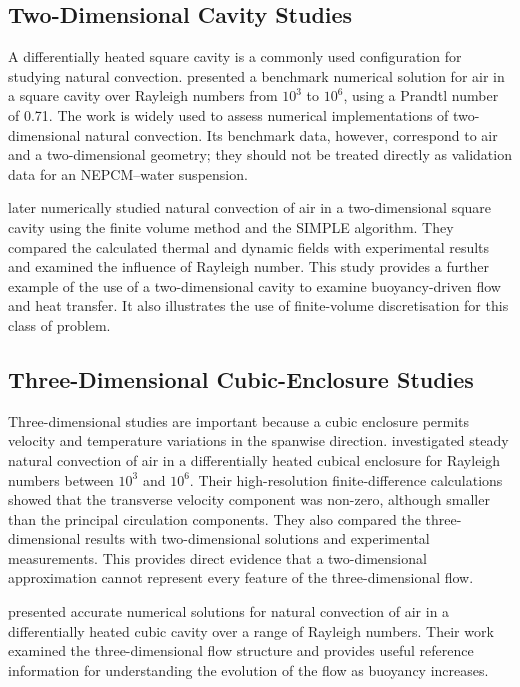 \subsection{Two-Dimensional Cavity Studies}

A differentially heated square cavity is a commonly used configuration for studying natural convection. \citet{devahldavis1983} presented a benchmark numerical solution for air in a square cavity over Rayleigh numbers from \(10^3\) to \(10^6\), using a Prandtl number of 0.71. The work is widely used to assess numerical implementations of two-dimensional natural convection. Its benchmark data, however, correspond to air and a two-dimensional geometry; they should not be treated directly as validation data for an NEPCM--water suspension.

\citet{benchabi2017} later numerically studied natural convection of air in a two-dimensional square cavity using the finite volume method and the SIMPLE algorithm. They compared the calculated thermal and dynamic fields with experimental results and examined the influence of Rayleigh number. This study provides a further example of the use of a two-dimensional cavity to examine buoyancy-driven flow and heat transfer. It also illustrates the use of finite-volume discretisation for this class of problem.

\subsection{Three-Dimensional Cubic-Enclosure Studies}

Three-dimensional studies are important because a cubic enclosure permits velocity and temperature variations in the spanwise direction. \citet{fusegi1991} investigated steady natural convection of air in a differentially heated cubical enclosure for Rayleigh numbers between \(10^3\) and \(10^6\). Their high-resolution finite-difference calculations showed that the transverse velocity component was non-zero, although smaller than the principal circulation components. They also compared the three-dimensional results with two-dimensional solutions and experimental measurements. This provides direct evidence that a two-dimensional approximation cannot represent every feature of the three-dimensional flow.

\citet{tric2000} presented accurate numerical solutions for natural convection of air in a differentially heated cubic cavity over a range of Rayleigh numbers. Their work examined the three-dimensional flow structure and provides useful reference information for understanding the evolution of the flow as buoyancy increases.

